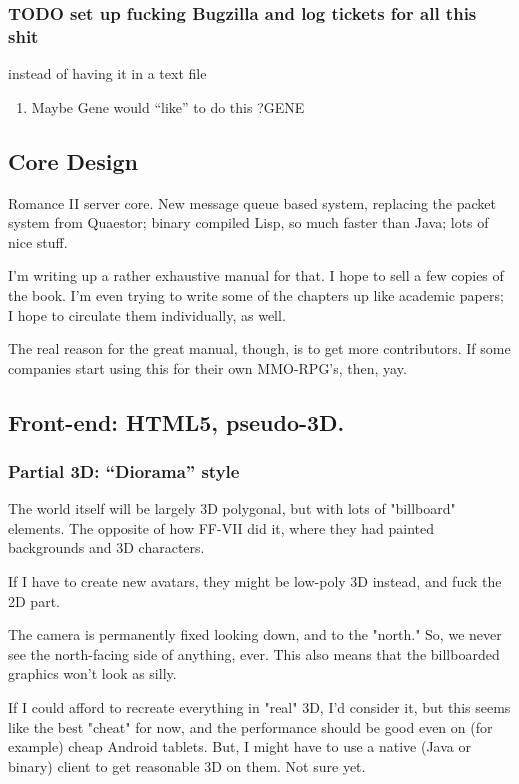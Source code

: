 \documentclass[11pt]{article}
\begin{document}
\subsubsection{{\bfseries\sffamily TODO} set up fucking Bugzilla and log tickets for all this shit}
\label{sec-1-3-3}
instead of having it in a text file

\begin{enumerate}
\item Maybe Gene would “like” to do this ?\hfill{}\textsc{GENE}
\label{sec-1-3-3-1}
\end{enumerate}
\subsection{Core Design}
\label{sec-1-4}

Romance II server core. New  message queue based system, replacing the
packet system from Quaestor; binary compiled Lisp, so much faster than
Java; lots of nice stuff.

I'm writing up a  rather exhaustive manual for that. I  hope to sell a
few copies of the book. I'm even  trying to write some of the chapters
up  like  academic papers;  I  hope  to circulate  them  individually,
as well.

The  real  reason  for  the  great manual,  though,  is  to  get  more
contributors.  If  some  companies  start using  this  for  their  own
MMO-RPG's, then, yay.
\subsection{Front-end: HTML5, pseudo-3D.}
\label{sec-1-5}

\subsubsection{Partial 3D: “Diorama” style}
\label{sec-1-5-1}

The  world itself  will  be largely  3D polygonal,  but  with lots  of
"billboard" elements.  The opposite of  how FF-VII did it,  where they
had painted backgrounds and 3D characters.

If I  have to create new  avatars, they might be  low-poly 3D instead,
and fuck the 2D part.

The camera is permanently fixed looking  down, and to the "north." So,
we never see the north-facing side  of anything, ever. This also means
that the billboarded graphics won't look as silly.

If I  could afford to recreate  everything in "real" 3D,  I'd consider
it, but this seems like the  best "cheat" for now, and the performance
should be  good even on  (for example)  cheap Android tablets.  But, I
might have to  use a native (Java or binary)  client to get reasonable
3D on them. Not sure yet.
\end{document}
